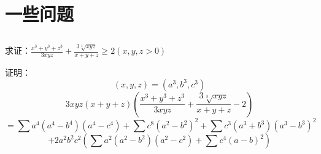 \documentclass[UTF8]{ctexart}
\begin{document}
\section{一些问题}
\subsection{}

求证：$ \displaystyle \frac{x^{3}+y^{3}+z^{3}}{3 x y z}+\displaystyle \frac{3 \sqrt[3]{x y z}}{x+y+z} \geq 2(x, y, z>0) $

证明：
$$ (x, y, z)=\left(a^{3}, b^{3}, c^{3}\right) $$
$$3 x y z(x+y+z)\left(\displaystyle \frac{x^{3}+y^{3}+z^{3}}{3 x y z}+\displaystyle \frac{3 \sqrt[3]{x y z}}{x+y+z}-2\right) $$
$$ =\displaystyle \sum a^{4}\left(a^{4}-b^{4}\right)\left(a^{4}-c^{4}\right)+\displaystyle \sum c^{8}\left(a^{2}-b^{2}\right)^{2}+\displaystyle \sum c^{3}\left(a^{3}+b^{3}\right)\left(a^{3}-b^{3}\right)^{2} $$
$$ +2 a^{2} b^{2} c^{2}\left(\displaystyle \sum a^{2}\left(a^{2}-b^{2}\right)\left(a^{2}-c^{2}\right)+\displaystyle \sum c^{4}(a-b)^{2}\right) $$
\end{document}
